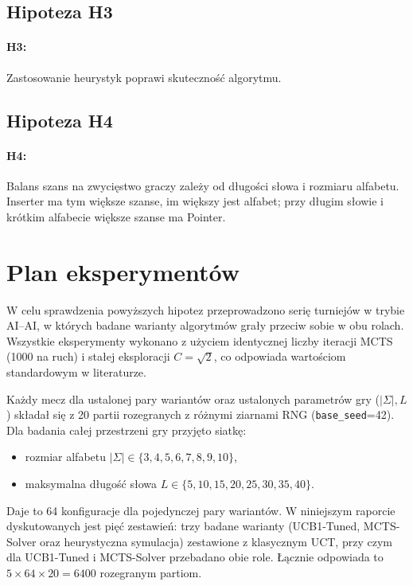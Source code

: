 \documentclass{article}
\begin{document}
\subsection*{Hipoteza H3}
\paragraph{H3:} Zastosowanie heurystyk poprawi skuteczność algorytmu.

\subsection*{Hipoteza H4}
\paragraph{H4:} Balans szans na zwycięstwo graczy zależy od długości
słowa i rozmiaru alfabetu. Inserter ma tym większe szanse, im większy
jest alfabet; przy długim słowie i krótkim alfabecie większe szanse ma
Pointer.

\section{Plan eksperymentów}

W celu sprawdzenia powyższych hipotez przeprowadzono serię turniejów
w trybie AI--AI, w których badane warianty algorytmów grały przeciw sobie
w obu rolach. Wszystkie eksperymenty wykonano z użyciem identycznej liczby
iteracji MCTS (1000 na ruch) i stałej eksploracji $C=\sqrt{2}$, co
odpowiada wartościom standardowym w literaturze.

Każdy mecz dla ustalonej pary wariantów oraz ustalonych parametrów gry
($|\Sigma|, L$) składał się z 20 partii rozegranych z różnymi ziarnami
RNG (\texttt{base\_seed}=42). Dla badania całej przestrzeni gry przyjęto
siatkę:
\begin{itemize}
    \item rozmiar alfabetu $|\Sigma|\in\{3,4,5,6,7,8,9,10\}$,
    \item maksymalna długość słowa $L\in\{5,10,15,20,25,30,35,40\}$.
\end{itemize}
Daje to 64 konfiguracje dla pojedynczej pary wariantów. W niniejszym
raporcie dyskutowanych jest pięć zestawień: trzy badane warianty
(UCB1-Tuned, MCTS-Solver oraz heurystyczna symulacja) zestawione
z klasycznym UCT, przy czym dla UCB1-Tuned i MCTS-Solver przebadano obie
role. Łącznie odpowiada to $5\times 64\times 20 = 6400$ rozegranym
partiom.
\end{document}

